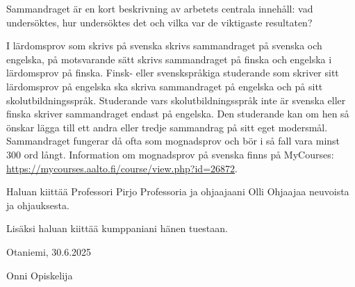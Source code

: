 \documentclass[finnish, 12pt, a4paper, arts, utf8, a-2b, online]{aaltothesis}
\begin{document}
\newpage
%
\date{21.9.2023}
\begin{abstractpage}[swedish]
Sammandraget är en kort beskrivning av arbetets centrala innehåll: vad 
undersöktes, hur undersöktes det och vilka var de viktigaste resultaten?

I lärdomsprov som skrivs på svenska skrivs sammandraget på svenska och engelska, 
på motsvarande sätt skrivs sammandraget på finska och engelska i lärdomsprov på 
finska. Finsk- eller svenskspråkiga studerande som skriver sitt lärdomsprov på 
engelska ska skriva sammandraget på engelska och på sitt skolutbildningsspråk. 
Studerande vars skolutbildningsspråk inte är svenska eller finska skriver 
sammandraget endast på engelska. Den studerande kan om hen så önskar lägga till 
ett andra eller tredje sammandrag på sitt eget modersmål. Sammandraget fungerar 
då ofta som mognadsprov och bör i så fall vara minst 300 ord långt. Information 
om mognadsprov på svenska finns på MyCourses:\\
\url{https://mycourses.aalto.fi/course/view.php?id=26872}.
\end{abstractpage}


\dothesispagenumbering{}


Haluan kiittää Professori Pirjo Professoria ja ohjaajaani Olli Ohjaajaa
neuvoista ja ohjauksesta.

Lisäksi haluan kiittää kumppaniani hänen tuestaan.

\vspace{5cm}
Otaniemi, 30.6.2025

\vspace{5mm}
{\hfill Onni Opiskelija \hspace{1cm}}
\end{document}
